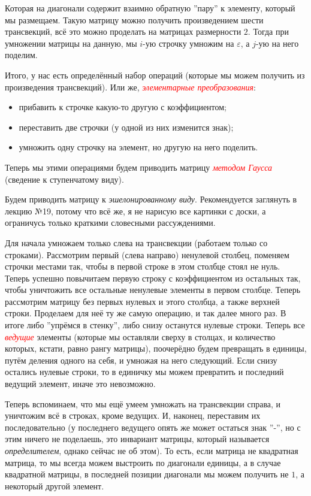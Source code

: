 \documentclass[a4paper,100pt]{article}
\theoremstyle{indented}
\theoremstyle{definition}
\theoremstyle{remark}
\begin{document}
Которая на диагонали содержит взаимно обратную ''пару'' к элементу, который мы размещаем. Такую матрицу можно получить произведением шести трансвекций, всё это можно проделать на матрицах размерности $2$. Тогда при умножении матрицы на данную, мы $i$-ую строчку умножим на $\varepsilon$, а $j$-ую на него поделим.\ 

Итого, у нас есть определённый набор операций (которые мы можем получить из произведения трансвекций). Или же, \hypertarget{n60}{\textcolor{red}{\textit{элементарные преобразования}}}: \

\begin{itemize}
    \item прибавить к строчке какую-то другую с коэффициентом;
    \item переставить две строчки (у одной из них изменится знак);
    \item умножить одну строчку на элемент, но другую на него поделить.
\end{itemize}

Теперь мы этими операциями будем приводить матрицу \hypertarget{n61}{\textcolor{red}{\textit{методом Гаусса}}} (сведение к ступенчатому виду).\ 

Будем приводить матрицу к \textit{эшелонированному виду}. Рекомендуется заглянуть в лекцию №19, потому что всё же, я не нарисую все картинки с доски, а ограничусь только краткими словесными рассуждениями. \ 

Для начала умножаем только слева на трансвекции (работаем только со строками). Рассмотрим первый (слева направо) ненулевой столбец, поменяем строчки местами так, чтобы в первой строке в этом столбце стоял не нуль. Теперь успешно повычитаем первую строку с коэффициентом из остальных так, чтобы уничтожить все остальные ненулевые элементы в первом столбце. Теперь рассмотрим матрицу без первых нулевых и этого столбца, а также верхней строки. Проделаем для неё ту же самую операцию, и так далее много раз. В итоге либо ''упрёмся в стенку'', либо снизу останутся нулевые строки. Теперь все \hypertarget{n62}{\textcolor{red}{\textit{ведущие}}} элементы (которые мы оставляли сверху в столцах, и количество которых, кстати, равно рангу матрицы), поочерёдно будем превращать в единицы, путём деления одного на себя, и умножая на него следующий. Если снизу остались нулевые строки, то в единичку мы можем превратить и последний ведущий элемент, иначе это невозможно.\ 

Теперь вспоминаем, что мы ещё умеем умножать на трансвекции справа, и уничтожим всё в строках, кроме ведущих. И, наконец, переставим их последовательно (у последнего ведущего опять же может остаться знак ''-'', но с этим ничего не поделаешь, это инвариант матрицы, который называется \textit{определителем}, однако сейчас не об этом). То есть, если матрица не квадратная матрица, то мы всегда можем выстроить по диагонали единицы, а в случае квадратной матрицы, в последней позиции диагонали мы можем получить не $1$, а некоторый другой элемент.\\
\end{document}
